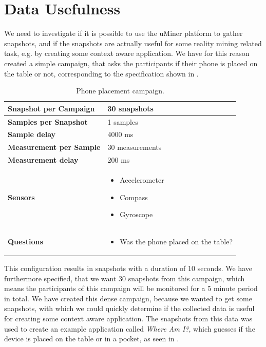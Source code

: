 
\section{Data Usefulness}
\label{sec:data_usefulness}

We need to investigate if it is possible to use the uMiner platform to gather snapshots, and if the snapshots are actually useful for some reality mining related task, e.g. by creating some context aware application. We have for this reason created a simple campaign, that asks the participants if their phone is placed on the table or not, corresponding to the specification shown in .

\begin{table}[!htbp]
    \centering
    \begin{tabular}{|m{}|m{}|} 
  \hline
  \textbf{Snapshot per Campaign}    & 30 snapshots      \\ \hline
  \textbf{Samples per Snapshot}     & 1 samples         \\ \hline
  \textbf{Sample delay}             & 4000 ms           \\ \hline
  \textbf{Measurement per Sample}   & 30 measurements   \\ \hline
  \textbf{Measurement delay}        & 200 ms            \\ \hline
  \textbf{Sensors}                  & \begin{itemize}[noitemsep]
                \item Accelerometer 
                \item Compass
                \item Gyroscope
              \end{itemize}                             \\ \hline
    \textbf{Questions}                & \begin{itemize}[noitemsep]
                                            \item Was the phone placed on the table?
                                        \end{itemize} \\ \hline
    \end{tabular}
    \caption{Phone placement campaign.}
    \label{tab:phone_placement_campaing}
\end{table}
\newpage
This configuration results in snapshots with a duration of 10 seconds. We have furthermore specified, that we want 30 snapshots from this campaign, which means the participants of this campaign will be monitored for a 5 minute period in total. We have created this dense campaign, because we wanted to get some snapshots, with which we could quickly determine if the collected data is useful for creating some context aware application. The snapshots from this data was used to create an example application called \emph{Where Am I?}, which guesses if the device is placed on the table or in a pocket, as seen in .
